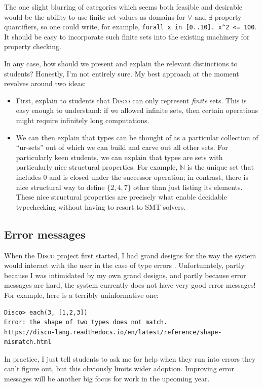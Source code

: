 \documentclass[submission,copyright,creativecommons]{eptcs}
\newcommand{\disco}{\textsc{Disco}\xspace}
\newcommand{\N}{\mathbb{N}}
\begin{document}
The one slight blurring of categories which seems both feasible and
desirable would be the ability to use finite set values as domains for
$\forall$ and $\exists$ property quantifiers, so one could write, for
example, \texttt{forall x in [0..10]. x^2 <= 100}.  It
should be easy to incorporate such finite sets into the existing
machinery for property checking.

In any case, how should we present and explain the relevant
distinctions to students?  Honestly, I'm not entirely sure.  My best
approach at the moment revolves around two ideas:
\begin{itemize}
\item First, explain to students that \disco can only represent
  \emph{finite} sets.  This is easy enough to understand: if we
  allowed infinite sets, then certain operations might require
  infinitely long computations.
\item We can then explain that types can be thought of as a particular
  collection of ``ur-sets'' out of which we can build and carve out
  all other sets.  For particularly keen students, we can explain that
  types are sets with particularly nice structural properties.  For
  example, $\N$ is the unique set that includes $0$ and is closed
  under the successor operation; in contrast, there is nice structural
  way to define $\{2,4,7\}$ other than just listing its elements.
  These nice structural properties are precisely what enable decidable
  typechecking without having to resort to SMT solvers.
\end{itemize}

\subsection{Error messages}
\label{sec:errors}

When the \disco project first started, I had grand designs for the way
the system would interact with the user in the case of type errors
\cite{yorgey2018explaining}. Unfortunately, partly because I was
intimidated by my own grand designs, and partly because error messages
are hard, the system currently does not have very good error messages!
For example, here is a terribly uninformative one:
\begin{verbatim}
Disco> each(3, [1,2,3])
Error: the shape of two types does not match.
https://disco-lang.readthedocs.io/en/latest/reference/shape-mismatch.html
\end{verbatim}
In practice, I just tell students to ask me for help when they run
into errors they can't figure out, but this obviously limits wider
adoption.  Improving error messages will be another big focus for work
in the upcoming year.
\end{document}
